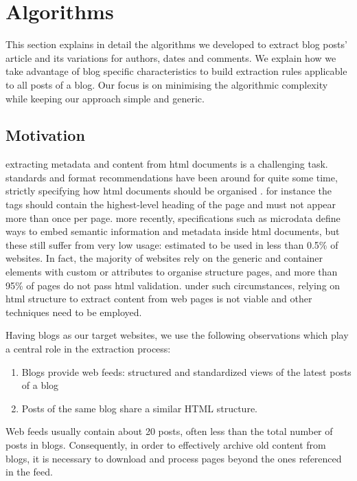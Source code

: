 \section{Algorithms}
\label{algorithms}

This section explains in detail the algorithms we developed to extract blog posts' article and its variations for authors, dates and comments.
We explain how we take advantage of blog specific characteristics to build extraction rules applicable to all posts of a blog.
Our focus is on minimising the algorithmic complexity while keeping our approach simple and generic.


\subsection{Motivation}
\label{motivation}

extracting metadata and content from html documents is a challenging task. standards and format recommendations have been around for quite some time, strictly specifying how html documents should be organised \cite{w3c2013}. for instance the  tags should contain the highest-level heading of the page and must not appear more than once per page\cite{w3c2002}. more recently, specifications such as microdata\cite{whatwg2013} define ways to embed semantic information and metadata inside html documents, but these still suffer from very low usage: estimated to be used in less than 0.5\%\cite{andrewrogers2013} of websites. In fact, the majority of websites rely on the generic  and  container elements with custom  or  attributes to organise structure pages\cite{brianwilson2008}, and more than 95\% of pages do not pass html validation\cite{brianwilson2008-a}. under such circumstances, relying on html structure to extract content from web pages is not viable and other techniques need to be employed.


Having blogs as our target websites, we use the following observations which play a central role in the extraction process:
\begin{enumerate}[label={(\arabic*)}]
  \item\label{havefeedAssum} Blogs provide web feeds: structured and standardized views of the latest posts of a blog
  \item\label{similarhtmlAssum} Posts of the same blog share a similar HTML structure.
\end{enumerate}
Web feeds usually contain about 20 posts\cite{oita2010}, often less than the total number of posts in blogs. Consequently, in order to effectively archive old content from blogs, it is necessary to download and process pages beyond the ones referenced in the feed.


